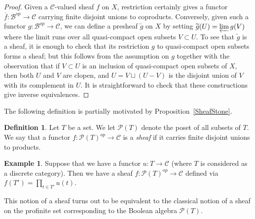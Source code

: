 \documentclass[reqno]{amsart}
\theoremstyle{definition}
\newtheorem{definition}[theorem]{Definition}
\newtheorem{example}[theorem]{Example}
\begin{document}
\begin{proof}
Given a $\mathcal{C}$-valued sheaf $f$ on $X$, restriction certainly gives a
functor $\overline{f}\colon \mathcal{B}^{op} \to \mathcal{C}$ carrying finite
disjoint unions to coproducts. Conversely, given such a functor $g\colon
\mathcal{B}^{op} \to \mathcal{C}$, we can define a presheaf $\widetilde{g}$ on
$X$ by setting $\widetilde{g}(U) = \varprojlim g(V)$ where the limit runs over
all quasi-compact open subsets $V \subset U$. To see that $\widetilde{g}$ is a
sheaf, it is enough to check that its restriction $g$ to quasi-compact open
subsets forms a sheaf; but this follows from the assumption on $g$ together
with the observation that if $V \subset U$ is an inclusion of quasi-compact open
subsets of $X$, then both $U$ and $V$ are clopen, and $U = V \sqcup (U-V)$ is
the disjoint union of $V$ with its complement in $U$. It is straightforward to
check that these constructions give inverse equivalences.  \end{proof}

The following definition is partially motivated by Proposition~\ref{SheafStone}.

\begin{definition} 
\label{SheafPowerSet}
Let $T$ be a set. We let $\mathcal{P}(T)$ denote the poset of all subsets of $T$.  We say that a functor $f\colon  \mathcal{P}(T)^{op} \to \mathcal{C}$ is a \emph{sheaf} if it carries finite disjoint unions to products.
\end{definition}
\begin{example} 
\label{prodfunctor}
Suppose that we have a functor $u\colon  T \to \mathcal{C}$ (where $T$ is considered as a
discrete category). Then we have a sheaf $f\colon  \mathcal{P}(T)^{op} \to
\mathcal{C} $ defined via $f(T') = \prod_{t \in T'} u(t)$. 
\end{example} 


This notion of a sheaf turns out to be equivalent to the classical notion of a sheaf on the profinite set corresponding to the Boolean algebra $\mathcal{P}(T)$.
\end{document}
